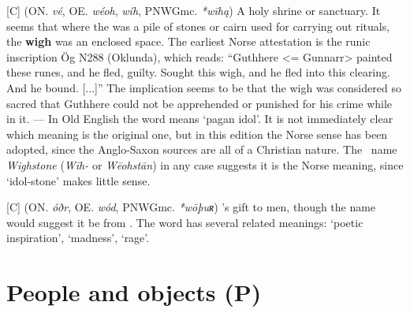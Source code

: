 \begin{itemize}
[C] (ON. \emph{vé}, OE. \emph{wéoh}, \emph{wíh}, PNWGmc. \emph{*wīhą})
  A holy shrine or sanctuary. It seems that where the  was a pile of stones or cairn used for carrying out rituals, the \textbf{wigh} was an enclosed space. The earliest Norse attestation is the runic inscription Ög N288 (Oklunda), which reads: “Guthhere <= Gunnarr> painted these runes, and he fled, guilty. Sought this wigh, and he fled into this clearing. And he bound. [...]” The implication seems to be that the wigh was considered so sacred that Guthhere could not be apprehended or punished for his crime while in it. — In Old English the word means ‘pagan idol’. It is not immediately clear which meaning is the original one, but in this edition the Norse sense has been adopted, since the Anglo-Saxon sources are all of a Christian nature. The \Beowulf\ name \emph{Wighstone} (\emph{Wīh-} or \emph{Wēohstān}) in any case suggests it is the Norse meaning, since ‘idol-stone’ makes little sense.

[C] (ON. \emph{óðr}, OE. \emph{wód}, PNWGmc. \emph{*wōþuʀ})
  's gift to men, though the name would suggest it be from . The word has several related meanings: ‘poetic inspiration’, ‘madness’, ‘rage’.

\end{itemize}


\section{People and objects (P)}

